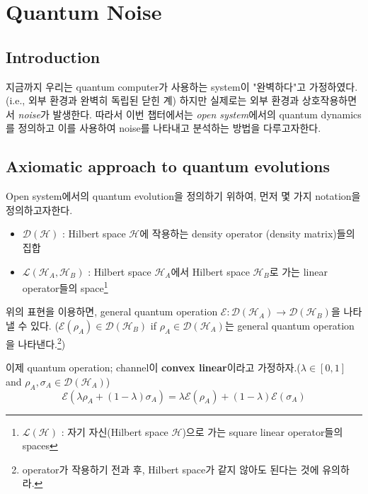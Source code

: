 \chapter{Quantum Noise}
\section{Introduction}
지금까지 우리는 quantum computer가 사용하는 system이 "완벽하다"고 가정하였다. (i.e., 외부 환경과 완벽히 독립된 닫힌 계)
하지만 실제로는 외부 환경과 상호작용하면서 \textit{noise}가 발생한다. 따라서 이번 챕터에서는 \textit{open system}에서의 quantum dynamics를 정의하고 이를 사용하여 noise를 나타내고 분석하는 방법을 다루고자한다. 

\section{Axiomatic approach to quantum evolutions}
Open system에서의 quantum evolution을 정의하기 위하여, 먼저 몇 가지 notation을 정의하고자한다.
\begin{itemize}[itemsep=0.05cm]
    \item $\mathcal{D}(\mathcal{H})$ : Hilbert space $\mathcal{H}$에 작용하는 density operator (density matrix)들의 집합
    \item $\mathcal{L}\left(\mathcal{H}_A, \mathcal{H}_B\right)$ : Hilbert space $\mathcal{H}_A$에서 Hilbert space $\mathcal{H}_B$로 가는 linear operator들의 space\footnote{ $\mathcal{L}(\mathcal{H})$ : 자기 자신(Hilbert space $\mathcal{H}$)으로 가는 square linear operator들의 spaces}
\end{itemize}
위의 표현을 이용하면, general quantum operation $\mathcal E : \mathcal D(\mathcal H_A) \rightarrow \mathcal D(\mathcal H_B)$을 나타낼 수 있다. ($\mathcal E(\rho_A) \in \mathcal D(\mathcal H_B)$ if $\rho_A \in \mathcal D(\mathcal H_A)$는 general quantum operation을 나타낸다.\footnote{operator가 작용하기 전과 후, Hilbert space가 같지 않아도 된다는 것에 유의하라.})

\vspace{0.6em}

이제 quantum operation; channel이 \textbf{convex linear}이라고 가정하자.($\lambda \in[0,1]$ and $\rho_A, \sigma_A \in \mathcal{D}\left(\mathcal{H}_A\right)$)
\begin{equation}
    \mathcal{E}\left(\lambda \rho_A+(1-\lambda) \sigma_A\right)=\lambda \mathcal{E}\left(\rho_A\right)+(1-\lambda) \mathcal{E}\left(\sigma_A\right)\label{eq:convex-evolution}
\end{equation}

